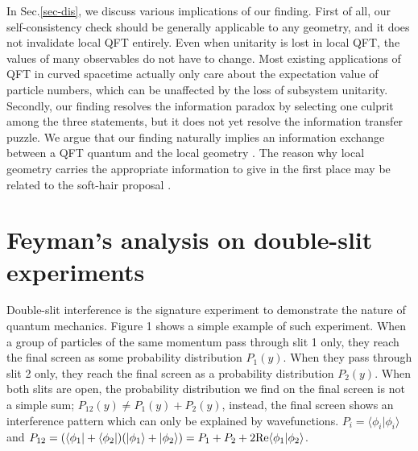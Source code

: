 \documentclass[aps,showpacs,onecolumn,floats,prd,superscriptaddress,nofootinbib]{revtex4-1}
\begin{document}
In Sec.\ref{sec-dis}, we discuss various implications of our finding. 
First of all, our self-consistency check should be generally applicable to any geometry, and it does not invalidate local QFT entirely. 
Even when unitarity is lost in local QFT, the values of many observables do not have to change. 
Most existing applications of QFT in curved spacetime actually only care about the expectation value of particle numbers, which can be unaffected by the loss of subsystem unitarity. 
Secondly, our finding resolves the information paradox by selecting one culprit among the three statements, but it does not yet resolve the information transfer puzzle. 
We argue that our finding naturally implies an information exchange between a QFT quantum and the local geometry \cite{OsuPag16}.
The reason why local geometry carries the appropriate information to give in the first place may be related to the soft-hair proposal \cite{HawPer16}. 

\section{Feyman's analysis on double-slit experiments}
\label{sec-DoubleSlit}

Double-slit interference is the signature experiment to demonstrate the nature of quantum mechanics. Figure 1 shows a simple example of such experiment.
When a group of particles of the same momentum pass through slit 1 only, they reach the final screen as some probability distribution $P_1(y)$. 
When they pass through slit 2 only, they reach the final screen as a probability distribution $P_2(y)$.
When both slits are open, the probability distribution we find on the final screen is not a simple sum; $P_{12}(y) \neq P_1(y) + P_2(y)$,
instead, the final screen shows an interference pattern which can only be explained by wavefunctions.
$P_i = \langle \phi_i | \phi_i \rangle$ and $P_{12} = (\langle \phi_1|+\langle \phi_2| ) (|\phi_1\rangle + | \phi_2 \rangle)=P_1 + P_2 + 2{\rm Re}\langle\phi_1|\phi_2\rangle$.
\end{document}
